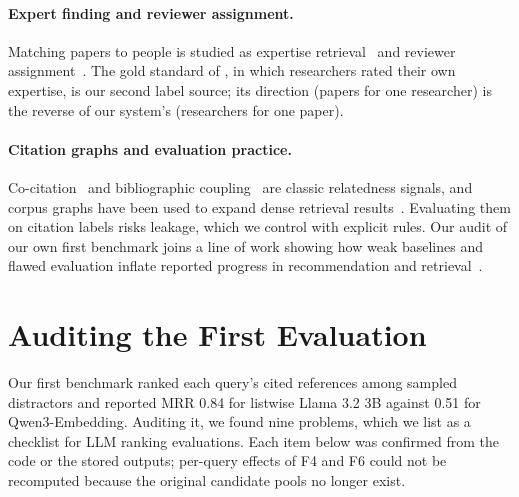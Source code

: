 \documentclass[sigconf,nonacm]{acmart}
\begin{document}
\paragraph{Expert finding and reviewer assignment.}
Matching papers to people is studied as expertise retrieval~\citep{balog2012expertise} and reviewer assignment~\citep{mimno2007expertise,charlin2013tpms}.
The gold standard of \citet{stelmakh2025gold}, in which researchers rated their own expertise, is our second label source; its direction (papers for one researcher) is the reverse of our system's (researchers for one paper).

\paragraph{Citation graphs and evaluation practice.}
Co-citation~\citep{small1973cocitation} and bibliographic coupling~\citep{kessler1963coupling} are classic relatedness signals, and corpus graphs have been used to expand dense retrieval results~\citep{macavaney2022gar,kulkarni2023ladr}.
Evaluating them on citation labels risks leakage, which we control with explicit rules.
Our audit of our own first benchmark joins a line of work showing how weak baselines and flawed evaluation inflate reported progress in recommendation and retrieval~\citep{ferraridacrema2019progress,ferraridacrema2021troubling,lin2019neuralhype}.

\section{Auditing the First Evaluation}
\label{sec:audit}
Our first benchmark ranked each query's cited references among sampled distractors and reported MRR 0.84 for listwise Llama 3.2 3B against 0.51 for Qwen3-Embedding.
Auditing it, we found nine problems, which we list as a checklist for LLM ranking evaluations.
Each item below was confirmed from the code or the stored outputs; per-query effects of F4 and F6 could not be recomputed because the original candidate pools no longer exist.
\end{document}
